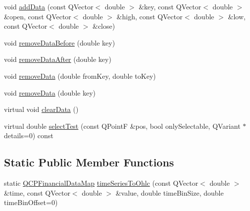 \begin{DoxyCompactItemize}
void \hyperlink{class_q_c_p_financial_aa1abe3bdafb297497f09cdbdc4db3958}{add\+Data} (const Q\+Vector$<$ double $>$ \&key, const Q\+Vector$<$ double $>$ \&open, const Q\+Vector$<$ double $>$ \&high, const Q\+Vector$<$ double $>$ \&low, const Q\+Vector$<$ double $>$ \&close)
\item 
void \hyperlink{class_q_c_p_financial_a097c0383c7c1e9042ca7f93cb439d15a}{remove\+Data\+Before} (double key)
\item 
void \hyperlink{class_q_c_p_financial_aa0fcd357005288c833a230c7874825ba}{remove\+Data\+After} (double key)
\item 
void \hyperlink{class_q_c_p_financial_a048c741d3c8cc5709c2c44b759fdf27c}{remove\+Data} (double from\+Key, double to\+Key)
\item 
void \hyperlink{class_q_c_p_financial_ae527d8a11290906b083d1ab598c380ea}{remove\+Data} (double key)
\item 
virtual void \hyperlink{class_q_c_p_financial_a11fd49928c33e55e27b7319c6927864a}{clear\+Data} ()
\item 
virtual double \hyperlink{class_q_c_p_financial_adf6cff00a55f775487d375fe4df5e95b}{select\+Test} (const Q\+PointF \&pos, bool only\+Selectable, Q\+Variant $\ast$details=0) const 
\end{DoxyCompactItemize}
\subsection*{Static Public Member Functions}
\begin{DoxyCompactItemize}
\item 
static \hyperlink{qcustomplot_8h_a745c09823fae0974b50beca9bc3b3d7d}{Q\+C\+P\+Financial\+Data\+Map} \hyperlink{class_q_c_p_financial_a0c3453d1c03e320950fdd2df54e3ebc8}{time\+Series\+To\+Ohlc} (const Q\+Vector$<$ double $>$ \&time, const Q\+Vector$<$ double $>$ \&value, double time\+Bin\+Size, double time\+Bin\+Offset=0)
\end{DoxyCompactItemize}
